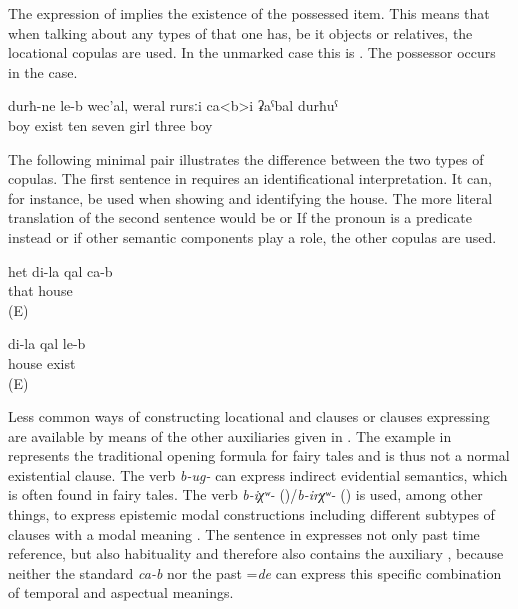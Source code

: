  
The expression of  implies the existence of the possessed item. This means that when talking about any types of  that one has, be it objects or relatives, the locational copulas are used. In the unmarked case this is  . The possessor occurs in the  case.

\begin{exe}
	\ex	\label{ex:‎(I) have ten children; they are seven girls and three boys}
	\gll	durħ-ne	le-b	wec'al,	weral	rursːi	ca<b>i	ʡaˁbal	durħuˁ\\
		boy	exist	ten	seven	girl		three	boy\\
	\glt	{}
\end{exe}

The following minimal pair illustrates the difference between the two types of copulas. The first sentence in  requires an identificational interpretation. It can, for instance, be used when showing and identifying the house. The more literal translation of the second sentence  would be  or  If the  pronoun is a predicate instead  or if other semantic components play a role, the other copulas are used. 

\begin{exe}
	\ex	\label{ex:That is my house}
	\gll	het	di-la	qal	ca-b\\
		that 	house	\\
	\glt	{} (E)

	\ex	\label{ex:I have a house}
	\gll	di-la	qal	le-b\\
			house	exist\\
	\glt	{} (E)
\end{exe}


Less common ways of constructing locational and  clauses or  clauses expressing  are available by means of the other auxiliaries given in . The example in  represents the traditional opening formula for fairy tales and is thus not a normal existential clause. The verb \textit{b-ug-} can express indirect evidential semantics, which is often found in fairy tales. The verb \textit{b-iχʷ-} ()\slash\textit{b-irχʷ-} ()  is used, among other things, to express epistemic modal constructions including different subtypes of  clauses with a modal meaning . The sentence in  expresses not only past time reference, but also habituality and therefore also contains the auxiliary , because neither the standard  \textit{ca-b} nor the past  =\textit{de} can express this specific combination of temporal and aspectual meanings.

